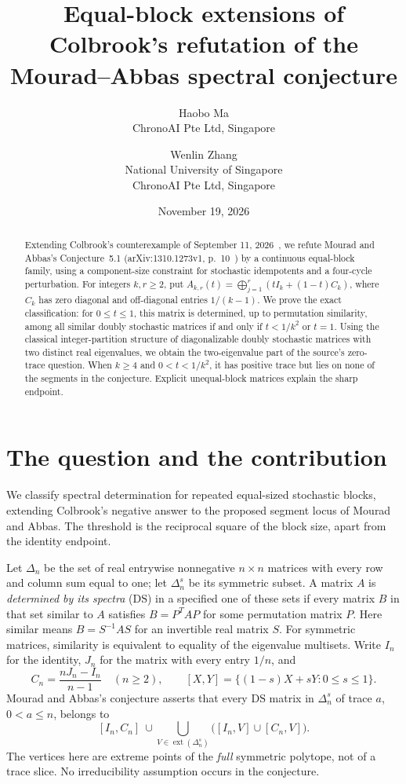 \documentclass[11pt]{article}
\title{Equal-block extensions of Colbrook's refutation of the Mourad--Abbas spectral conjecture}
\author{Haobo Ma\\\small ChronoAI Pte Ltd, Singapore
\and Wenlin Zhang\\\small National University of Singapore\\\small ChronoAI Pte Ltd, Singapore}
\date{November 19, 2026}
\newcommand{\DS}{\mathrm{DS}}
\newcommand{\Del}{\Delta}
\begin{document}
\maketitle
\begin{abstract}
Extending Colbrook's counterexample of September 11, 2026~\cite{Colbrook}, we refute Mourad and Abbas's Conjecture~5.1 (arXiv:1310.1273v1, p.~10~\cite{MA}) by a continuous equal-block family, using a component-size constraint for stochastic idempotents and a four-cycle perturbation.
For integers $k,r\geq2$, put $A_{k,r}(t)=\bigoplus_{j=1}^r(tI_k+(1-t)C_k)$, where $C_k$ has zero diagonal and off-diagonal entries $1/(k-1)$.
We prove the exact classification: for $0\leq t\leq1$, this matrix is determined, up to permutation similarity, among all similar doubly stochastic matrices if and only if $t<1/k^2$ or $t=1$.
Using the classical integer-partition structure of diagonalizable doubly stochastic matrices with two distinct real eigenvalues, we obtain the two-eigenvalue part of the source's zero-trace question.
When $k\geq4$ and $0<t<1/k^2$, it has positive trace but lies on none of the segments in the conjecture. Explicit unequal-block matrices explain the sharp endpoint.
\end{abstract}

\section{The question and the contribution}
We classify spectral determination for repeated equal-sized stochastic blocks, extending Colbrook's negative answer to the proposed segment locus of Mourad and Abbas. The threshold is the reciprocal square of the block size, apart from the identity endpoint.

Let $\Del_n$ be the set of real entrywise nonnegative $n\times n$ matrices with every row and column sum equal to one; let $\Del_n^s$ be its symmetric subset.
A matrix $A$ is \emph{determined by its spectra} ($\DS$) in a specified one of these sets if every matrix $B$ in that set similar to $A$ satisfies $B=P^TAP$ for some permutation matrix $P$.
Here similar means $B=S^{-1}AS$ for an invertible real matrix $S$.
For symmetric matrices, similarity is equivalent to equality of the eigenvalue multisets.
Write $I_n$ for the identity, $J_n$ for the matrix with every entry $1/n$, and
\[
 C_n=\frac{nJ_n-I_n}{n-1}\quad(n\geq2),\qquad
 [X,Y]=\{(1-s)X+sY:0\leq s\leq1\}.
\]
Mourad and Abbas's conjecture asserts that every $\DS$ matrix in $\Del_n^s$ of trace $a$, $0<a\leq n$, belongs to
\begin{equation}\label{eq:locus}
 [I_n,C_n]\ \cup\!
 \bigcup_{V\in\operatorname{ext}(\Del_n^s)}\bigl([I_n,V]\cup[C_n,V]\bigr).
\end{equation}
The vertices here are extreme points of the \emph{full} symmetric polytope, not of a trace slice. No irreducibility assumption occurs in the conjecture.
\end{document}
